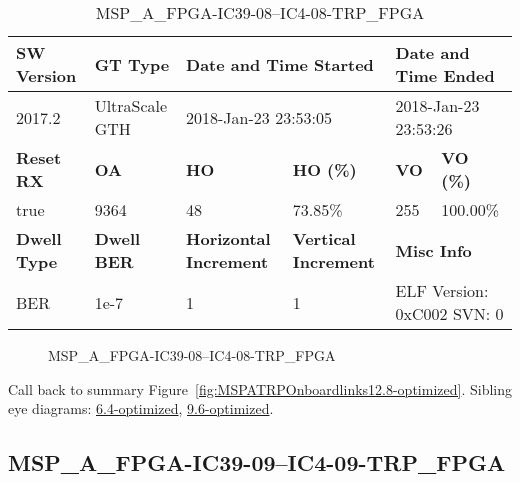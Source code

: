 \begin{table}[h]
\centering
\caption{MSP\_A\_FPGA-IC39-08--IC4-08-TRP\_FPGA}
\label{tab:MSPAFPGAIC3908IC408TRPFPGA12.8-optimized}
\begin{tabular}{@{}|l|l|l|l|l|l|@{}}
\toprule
\textbf{SW Version}                & \textbf{GT Type}   & \multicolumn{2}{l|}{\textbf{Date and Time Started}}            & \multicolumn{2}{l|}{\textbf{Date and Time Ended}}        \\ \midrule
2017.2                       & UltraScale GTH          & \multicolumn{2}{l|}{2018-Jan-23 23:53:05}                   & \multicolumn{2}{l|}{2018-Jan-23 23:53:26}               \\ \midrule
\textbf{Reset RX}                  & \textbf{OA} & \textbf{HO}   & \textbf{HO (\%)} & \textbf{VO} & \textbf{VO (\%)} \\ \midrule
true & 9364        & 48          & 73.85\%        & 255        & 100.00\%       \\ \midrule
\textbf{Dwell Type}                & \textbf{Dwell BER} & \textbf{Horizontal Increment} & \textbf{Vertical Increment}    & \multicolumn{2}{l|}{\textbf{Misc Info}}                  \\ \midrule
BER                            & 1e-7        & 1        & 1           & \multicolumn{2}{l|}{ELF Version: 0xC002 SVN: 0}                         \\ \bottomrule
\end{tabular}
\end{table}

\begin{figure}[h]
\caption{MSP\_A\_FPGA-IC39-08--IC4-08-TRP\_FPGA} \label{fig:MSPAFPGAIC3908IC408TRPFPGA12.8-optimized}
\end{figure}

Call back to summary Figure~\ref{fig:MSPATRPOnboardlinks12.8-optimized}.
Sibling eye diagrams: \hyperref[sec:MSPAFPGAIC3908IC408TRPFPGA6.4-optimized]{6.4-optimized}, \hyperref[sec:MSPAFPGAIC3908IC408TRPFPGA9.6-optimized]{9.6-optimized}.

\clearpage
\newpage


\subsection{MSP\_A\_FPGA-IC39-09--IC4-09-TRP\_FPGA}\label{sec:MSPAFPGAIC3909IC409TRPFPGA12.8-optimized}


